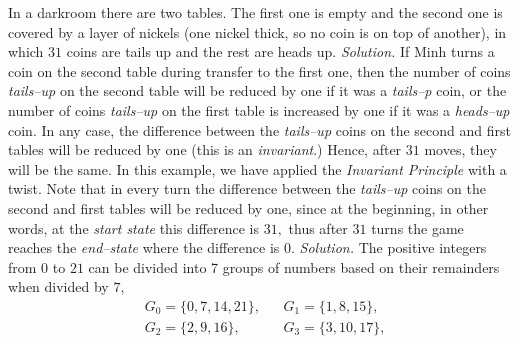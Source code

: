 \begin{multicols}{2}
{		In a darkroom there are two tables. The first one is empty and the second one is covered by a layer of nickels
		(one nickel thick, so no coin is on top of another), in which $31$ coins are tails up and the rest are heads up.}
	\vskip 0.1cm
	\vskip 0.2cm
	\textit{Solution.}
	If Minh turns a coin on the second table during transfer to the first one,
	then the number of coins \textit{tails--up} on the second table will be reduced by one if it was a \textit{tails--p} coin,
	or the number of coins \textit{tails--up} on the first table is increased by one if it was a \textit{heads--up} coin.
	In any case, the difference between the \textit{tails--up} coins on the second and first tables will be reduced by one
	(this is an \textit{invariant}.) Hence, after $31$ moves, they will be the same.
	\vskip 0.1cm
	In this example, we have applied the \textit{Invariant Principle} with a twist.
	Note that in every turn the difference between the \textit{tails--up} coins on the second and first tables will be reduced by one,
	since at the beginning, in other words, at the \textit{start state} this difference is $31,$
	thus after $31$ turns the game reaches the \textit{end--state} where the difference is $0.$
	\vskip 0.2cm
	\vskip 0.2cm
	\textit{Solution.}
	The positive integers from $0$ to $21$ can be divided into 7 groups of numbers based on their remainders when divided by $7$,
	\begin{align*}
		&G_0=\{0,7,14,21\}, &&G_1=\{1,8,15\},\\
		& G_2=\{2,9,16\}, &&G_3=\{3,10,17\},\\

\end{align*}
\end{multicols}

